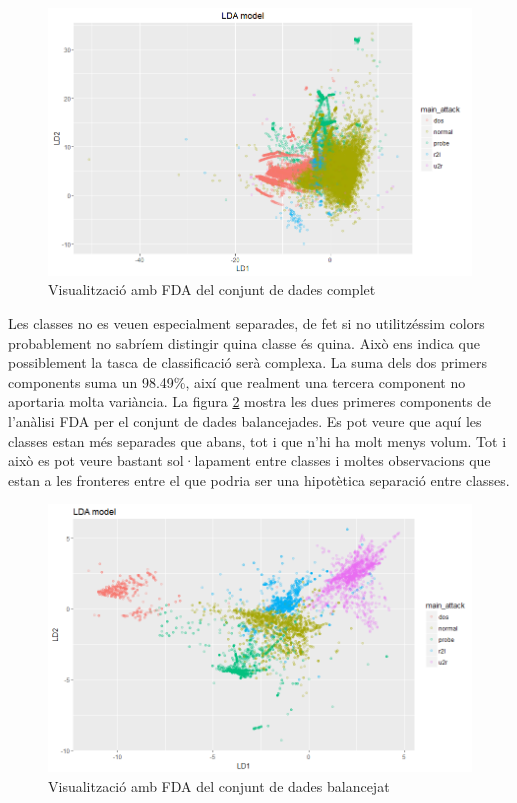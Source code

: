 \documentclass[a4paper]{article} %
\begin{document}
\begin{figure}[H]
	\centering
	\includegraphics[scale=0.45]{LDA.png}
	\caption{Visualització amb FDA del conjunt de dades complet}
	\label{fig:fda}
\end{figure}

Les classes no es veuen especialment separades, de fet si no utilitzéssim colors probablement no sabríem distingir quina classe és quina. Això ens indica que possiblement la tasca de classificació serà complexa. La suma dels dos primers components suma un 98.49\%, així que realment una tercera component no aportaria molta variància. La figura \ref{fig:fda_bal} mostra les dues primeres components de l'anàlisi FDA per el conjunt de dades balancejades. Es pot veure que aquí les classes estan més separades que abans, tot i que n'hi ha molt menys volum. Tot i això es pot veure bastant sol·lapament entre classes i moltes observacions que estan a les fronteres entre el que podria ser una hipotètica separació entre classes.

\begin{figure}[H]
	\centering
	\includegraphics[scale=0.45]{lda_balanced.png}
	\caption{Visualització amb FDA del conjunt de dades balancejat}
	\label{fig:fda_bal}
\end{figure}
\end{document}
